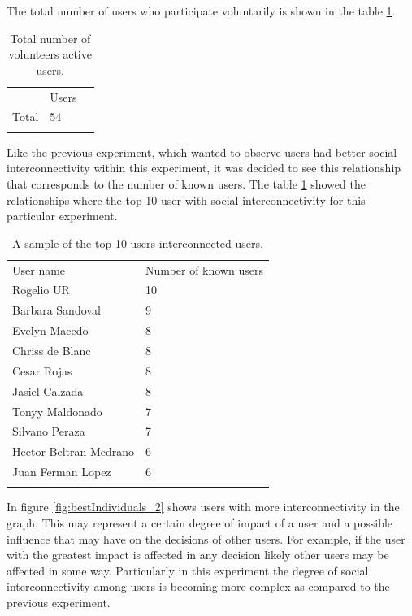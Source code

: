 The total number of users who participate voluntarily is shown in the table \ref{tab:totalUsers_1}.

\begin{table}
\small
\caption{Total number of volunteers active users.}
\label{tab:totalUsers_1}
\centering
\small
\begin{tabular}{p{3cm} p{3cm} p{3cm} }
\hline\noalign{\smallskip}
  & Users &  \\
\noalign{\smallskip}\hline\noalign{\smallskip}
\small{Total } & \small{54} & \\ \hline
\noalign{\smallskip}\hline
\end{tabular}
\end{table}

Like the previous experiment, which wanted to observe users had better social
interconnectivity within this experiment, it was decided to see this
relationship that corresponds to the number of known users. The table \ref{tab:totalUsers_1} 
showed the relationships where the top 10 user  with social
interconnectivity for this particular experiment.


\begin{table}
\small
\caption{A sample of the top 10 users interconnected users.}
\label{tab:knownUsers_2}
\centering
\small
\begin{tabular}{p{3cm} p{3cm}  }
\hline\noalign{\smallskip}
 User name & Number of known users \\
\noalign{\smallskip}\hline\noalign{\smallskip}
\small{Rogelio UR} & \small{10}  \\ \hline
\small{Barbara Sandoval} & \small{9}  \\ \hline
\small{Evelyn Macedo} & \small{8}  \\ \hline
\small{Chriss de Blanc} & \small{8}  \\ \hline
\small{Cesar Rojas} & \small{8}  \\ \hline
\small{Jasiel Calzada} & \small{8}  \\ \hline
\small{Tonyy Maldonado} & \small{7}  \\ \hline
\small{Silvano Peraza} & \small{7}  \\ \hline
\small{Hector Beltran Medrano} & \small{6}  \\ \hline
\small{Juan Ferman Lopez} & \small{6}  \\ \hline
\noalign{\smallskip}\hline
\end{tabular}
\end{table}

In figure \ref{fig:bestIndividuals_2} shows users with more interconnectivity in the
graph. This may represent a certain degree of impact of a user and a possible influence 
that may have on the decisions of other users. For example, if the
user with the greatest impact is affected in any decision likely other users may
be affected in some way. Particularly in this experiment the degree of social
interconnectivity among users is becoming more complex as compared to the
previous experiment.

